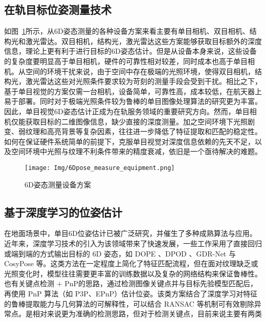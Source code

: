 \subsection{在轨目标位姿测量技术}
如图~\ref{fig:6D_equip}所示，从6D姿态测量的各种设备方案来看主要有单目相机\cite{PAULY2023339, 9802504,Zhang_2024_CVPR,Liu_2024_CVPR}、双目相机\cite{GXXB202106018, zhang2017optimization,Fan2024}、结构光\cite{laser_stereo,hu2023non,sun2022relative}和激光雷达\cite{10801205,10823741}。双目相机，结构光，激光雷达这些方案能够获取目标额外的深度信息，理论上更有利于进行目标的6D姿态估计。但是从设备本身来说，这些设备的复杂度要明显高于单目相机，硬件的可靠性相对较差，同时成本也高于单目相机。从空间的环境干扰来说，由于空间中存在极端的光照环境，使得双目相机，结构光，激光雷达这些对光照条件要求较为苛刻的测量手段会受到干扰\cite{rs15092286,tian2023all}。相比之下，基于单目视觉的方案仅需一台相机，设备简单，可靠性高，成本较低，在航天器上易于部署。同时对于极端光照条件较为鲁棒的单目图像处理算法的研究更为丰富。因此，单目视觉6D姿态估计正成为在轨服务领域的重要研究方向。然而，单目相机仅能获取目标的二维图像信息，缺少直接的深度测量。加之空间环境下光照剧变、弱纹理和高亮背景等复杂因素，往往进一步降低了特征提取和匹配的稳定性\cite{Hu_2021_CVPR,wang2022revisiting}。如何在保证硬件系统简单的前提下，克服单目视觉对深度信息依赖的先天不足，以及空间环境中光照与纹理不利条件带来的精度衰减，依旧是一个亟待解决的难题。
\begin{figure}[htbp]
	\centering
	\texttt{[image: Img/6Dpose\_measure\_equipment.png]}
	\caption{6D姿态测量设备方案}
	\label{fig:6D_equip}
\end{figure}
\subsection{基于深度学习的位姿估计}
在地面场景中，单目6D位姿估计已被广泛研究，并催生了多种成熟算法与应用。近年来，深度学习技术的引入为该领域带来了快速发展，一些工作采用了直接回归或端到端的方式输出目标的 6D 姿态，如 DOPE \cite{Tekin2018DOPE}、DPOD \cite{Li2019DPOD}、GDR-Net \cite{Wang2021GDRNet} 与 CosyPose \cite{Peng2020CosyPose6D} 等。这类方法在一定程度上简化了特征匹配流程，但在面对纹理缺乏或光照变化时，模型往往需要更丰富的训练数据以及复杂的网络结构来保证鲁棒性。
也有关键点检测 + PnP的思路，通过检测图像关键点并与目标先验模型匹配后，再使用 PnP 算法（如 P3P、EPnP）估计位姿。该类方案结合了深度学习对特征的鲁棒提取能力与几何算法的可解释性，可以结合 RANSAC 等机制可有效剔除异常点。是相对来说更为准确的检测思路，但对于检测关键点，目前来说主要有两类

